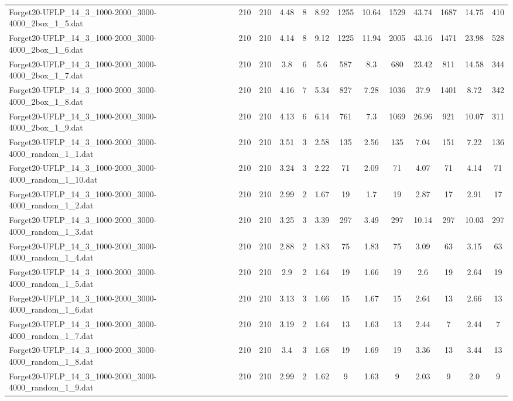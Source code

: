 \begin{table}[!ht]
{\begin{tabular}{lcccccccccccc}
Forget20-UFLP\_14\_3\_1000-2000\_3000-4000\_2box\_1\_5.dat & 210 & 210 & 4.48 & 8 & 8.92 & 1255 & 10.64 & 1529 & 43.74 & 1687 & 14.75 & 410 \\
Forget20-UFLP\_14\_3\_1000-2000\_3000-4000\_2box\_1\_6.dat & 210 & 210 & 4.14 & 8 & 9.12 & 1225 & 11.94 & 2005 & 43.16 & 1471 & 23.98 & 528 \\
Forget20-UFLP\_14\_3\_1000-2000\_3000-4000\_2box\_1\_7.dat & 210 & 210 & 3.8 & 6 & 5.6 & 587 & 8.3 & 680 & 23.42 & 811 & 14.58 & 344 \\
Forget20-UFLP\_14\_3\_1000-2000\_3000-4000\_2box\_1\_8.dat & 210 & 210 & 4.16 & 7 & 5.34 & 827 & 7.28 & 1036 & 37.9 & 1401 & 8.72 & 342 \\
Forget20-UFLP\_14\_3\_1000-2000\_3000-4000\_2box\_1\_9.dat & 210 & 210 & 4.13 & 6 & 6.14 & 761 & 7.3 & 1069 & 26.96 & 921 & 10.07 & 311 \\
Forget20-UFLP\_14\_3\_1000-2000\_3000-4000\_random\_1\_1.dat & 210 & 210 & 3.51 & 3 & 2.58 & 135 & 2.56 & 135 & 7.04 & 151 & 7.22 & 136 \\
Forget20-UFLP\_14\_3\_1000-2000\_3000-4000\_random\_1\_10.dat & 210 & 210 & 3.24 & 3 & 2.22 & 71 & 2.09 & 71 & 4.07 & 71 & 4.14 & 71 \\
Forget20-UFLP\_14\_3\_1000-2000\_3000-4000\_random\_1\_2.dat & 210 & 210 & 2.99 & 2 & 1.67 & 19 & 1.7 & 19 & 2.87 & 17 & 2.91 & 17 \\
Forget20-UFLP\_14\_3\_1000-2000\_3000-4000\_random\_1\_3.dat & 210 & 210 & 3.25 & 3 & 3.39 & 297 & 3.49 & 297 & 10.14 & 297 & 10.03 & 297 \\
Forget20-UFLP\_14\_3\_1000-2000\_3000-4000\_random\_1\_4.dat & 210 & 210 & 2.88 & 2 & 1.83 & 75 & 1.83 & 75 & 3.09 & 63 & 3.15 & 63 \\
Forget20-UFLP\_14\_3\_1000-2000\_3000-4000\_random\_1\_5.dat & 210 & 210 & 2.9 & 2 & 1.64 & 19 & 1.66 & 19 & 2.6 & 19 & 2.64 & 19 \\
Forget20-UFLP\_14\_3\_1000-2000\_3000-4000\_random\_1\_6.dat & 210 & 210 & 3.13 & 3 & 1.66 & 15 & 1.67 & 15 & 2.64 & 13 & 2.66 & 13 \\
Forget20-UFLP\_14\_3\_1000-2000\_3000-4000\_random\_1\_7.dat & 210 & 210 & 3.19 & 2 & 1.64 & 13 & 1.63 & 13 & 2.44 & 7 & 2.44 & 7 \\
Forget20-UFLP\_14\_3\_1000-2000\_3000-4000\_random\_1\_8.dat & 210 & 210 & 3.4 & 3 & 1.68 & 19 & 1.69 & 19 & 3.36 & 13 & 3.44 & 13 \\
Forget20-UFLP\_14\_3\_1000-2000\_3000-4000\_random\_1\_9.dat & 210 & 210 & 2.99 & 2 & 1.62 & 9 & 1.63 & 9 & 2.03 & 9 & 2.0 & 9 \\

\end{tabular}}
\end{table}
